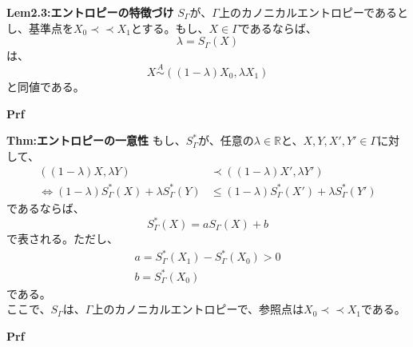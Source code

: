 \documentclass[a4paper,11pt]{jsarticle}
\begin{document}
\begin{itembox}[l]{\textbf{Lem2.3:エントロピーの特徴づけ}}
$S_{\Gamma}$が、$\Gamma$上のカノニカルエントロピーであるとし、基準点を$X_0 \prec \prec X_1$とする。もし、$X\in \Gamma$であるならば、
\begin{equation}
    \lambda = S_{\Gamma}(X)
\end{equation}
は、
\begin{equation}
    X \overset{A}{\sim} ((1-\lambda)X_0,\lambda X_1)
\end{equation}
と同値である。\\

\end{itembox}
\textbf{Prf}\\


\begin{itembox}[l]{\textbf{Thm:エントロピーの一意性}}
もし、$S_{\Gamma}^*$が、任意の$\lambda \in \mathbb{R}$と、$X,Y,X',Y' \in \Gamma $に対して、
\begin{align}
    ((1-\lambda)X,\lambda Y) &\prec ((1-\lambda)X',\lambda Y') \\
    \Leftrightarrow (1-\lambda)S_{\Gamma}^*(X)+\lambda S_{\Gamma}^*(Y) &\leq (1-\lambda)S_{\Gamma}^*(X')+\lambda S_{\Gamma}^*(Y')
\end{align}
であるならば、
\begin{equation}
    S_{\Gamma}^*(X)=aS_{\Gamma} (X)+b
\end{equation}
で表される。ただし、
\begin{align}
    a = S_{\Gamma}^*(X_1)-S_{\Gamma}^*(X_0)>0\\
    b = S_{\Gamma}^*(X_0)
\end{align}
である。\\
ここで、$S_{\Gamma}$は、$\Gamma$上のカノニカルエントロピーで、参照点は$X_0 \prec \prec X_1$である。
\end{itembox}
\textbf{Prf}\\

\qedsymbol\\
\end{document}
